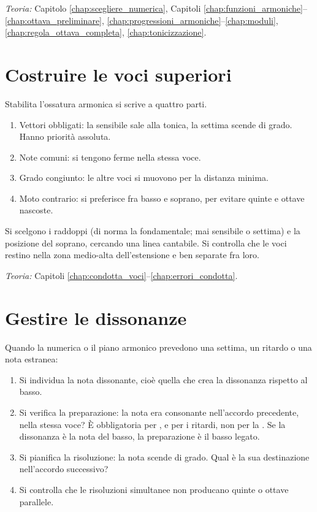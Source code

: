 \textit{Teoria:} Capitolo \ref{chap:scegliere_numerica}, Capitoli \ref{chap:funzioni_armoniche}--\ref{chap:ottava_preliminare}, \ref{chap:progressioni_armoniche}--\ref{chap:moduli}, \ref{chap:regola_ottava_completa}, \ref{chap:tonicizzazione}.

\section{Costruire le voci superiori}
\label{sec:fase4_numerato}

Stabilita l'ossatura armonica si scrive a quattro parti.

\begin{regola}
	\label{reg:priorita_scrittura_numerato}
	\begin{enumerate}
		\item Vettori obbligati: la sensibile sale alla tonica, la settima scende di grado. Hanno priorità assoluta.
		\item Note comuni: si tengono ferme nella stessa voce.
		\item Grado congiunto: le altre voci si muovono per la distanza minima.
		\item Moto contrario: si preferisce fra basso e soprano, per evitare quinte e ottave nascoste.
	\end{enumerate}
\end{regola}

Si scelgono i raddoppi (di norma la fondamentale; mai sensibile o settima) e la posizione del soprano, cercando una linea cantabile. Si controlla che le voci restino nella zona medio-alta dell'estensione e ben separate fra loro.

\textit{Teoria:} Capitoli \ref{chap:condotta_voci}--\ref{chap:errori_condotta}.

\section{Gestire le dissonanze}
\label{sec:fase5_numerato}

Quando la numerica o il piano armonico prevedono una settima, un ritardo o una nota estranea:

\begin{regola}
	\label{reg:dissonanze_realizzazione}
	\begin{enumerate}
		\item Si individua la nota dissonante, cioè quella che crea la dissonanza rispetto al basso.
		\item Si verifica la preparazione: la nota era consonante nell'accordo precedente, nella stessa voce? È obbligatoria per ,  e per i ritardi, non per la . Se la dissonanza è la nota del basso, la preparazione è il basso legato.
		\item Si pianifica la risoluzione: la nota scende di grado. Qual è la sua destinazione nell'accordo successivo?
		\item Si controlla che le risoluzioni simultanee non producano quinte o ottave parallele.
	\end{enumerate}
\end{regola}

